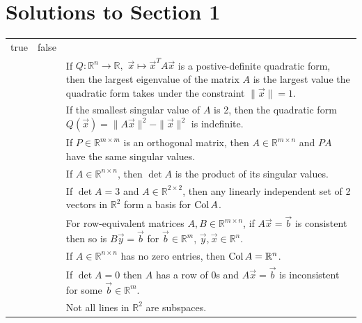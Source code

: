 
\section{Solutions to Section 1}
	\begin{table}[!h]
		\centering
		\begin{tabular}{c@{\hspace{2.5em}}cp{}}
			true & false & \\
			\specialrule{\lightrulewidth}{0.25em}{1.25em}
			\dbubble & \bubble & If \(Q \colon \mathbb{R}^n \to \mathbb{R},\) \(\vec{x} \mapsto \vec{x}^TA\vec{x}\) is a postive-definite quadratic 
						      form, then the largest eigenvalue of the matrix \(A\) is the largest value the quadratic form takes under the 
						      constraint \(\|\vec{x}\| = 1\). \\[0.75em]
			\bubble & \dbubble & If the smallest singular value of \(A\) is 2, then the quadratic form \(Q(\vec{x}) = \|A\vec{x}\|^2 - \|\vec{x}\|^2\) is
						      indefinite. \\[0.75em]
			\dbubble & \bubble & If \(P \in \mathbb{R}^{m \times m}\) is an orthogonal matrix, then \(A \in \mathbb{R}^{m \times n}\) and 
						     \(PA\) have the same singular values. \\[0.75em]
			\bubble & \dbubble & If \(A \in \mathbb{R}^{n \times n}\), then \(\det A\) is the product of its singular values. \\[0.75em] 
			\dbubble & \bubble & If \(\det A = 3\) and \(A \in \mathbb{R}^{2 \times 2}\), then any linearly independent set of 2 vectors in 
						      \(\mathbb{R}^2\) form a basis for \(\operatorname{Col} A\). \\[0.75em]
			\bubble & \dbubble & For row-equivalent matrices \(A, B \in \mathbb{R}^{m \times n}\), if \(A\vec{x} = \vec{b}\) is consistent then so is
						      \(B\vec{y} = \vec{b}\) for \(\vec{b} \in \mathbb{R}^m\), \(\vec{y}, \vec{x} \in \mathbb{R}^n\).\\[0.75em]
			\bubble & \dbubble & If \(A \in \mathbb{R}^{n \times n}\) has no zero entries, then \(\operatorname{Col} A = \mathbb{R}^n\). \\[0.75em]
			\bubble & \dbubble & If \(\det A = 0\) then \(A\) has a row of 0s and \(A\vec{x} = \vec{b}\) is inconsistent for some 
						      \(\vec{b} \in \mathbb{R}^m\). \\[0.75em]
			\dbubble & \bubble & Not all lines in \(\mathbb{R}^2\) are subspaces. \\[0.75em]

\end{tabular}
\end{table}
